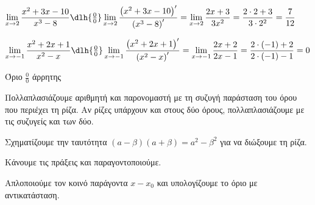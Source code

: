 \lysh\vspace{-5mm}
\begin{alist}
\item $\lim\limits_{x\to 2}{\dfrac{x^2+3x-10}{x^3-8}}\dlh{\frac{0}{0}}\lim\limits_{x\to 2}{\dfrac{\left(x^2+3x-10\right)'}{\left(x^3-8\right)'}}=\lim\limits_{x\to 2}{\dfrac{2x+3}{3x^2}}=\dfrac{2\cdot 2+3}{3\cdot 2^2}=\dfrac{7}{12}$
\item $\lim\limits_{x\to-1}{\dfrac{x^2+2x+1}{x^2-x}}\dlh{\frac{0}{0}}\lim\limits_{x\to-1}{\dfrac{\left(x^2+2x+1\right)'}{\left(x^2-x\right)'}}=\lim\limits_{x\to-1}{\dfrac{2x+2}{2x-1}}=\dfrac{2\cdot\left(-1\right)+2}{2\cdot(-1)-1}=0$
\end{alist}
\begin{askhsh}{Όριο $ \frac{0}{0} $ άρρητης}
\bhmata\begin{bhma}
\item Πολλαπλασιάζουμε αριθμητή και παρονομαστή με τη συζυγή παράσταση του όρου που περιέχει τη ρίζα. Αν ρίζες υπάρχουν και στους δύο όρους, πολλαπλασιάζουμε με τις συζυγείς και των δύο.
\item Σχηματίζουμε την ταυτότητα $(a-\beta)(a+\beta)=a^2-\beta^2$ για να διώξουμε τη ρίζα.
\item Κάνουμε τις πράξεις και παραγοντοποιούμε.
\item Απλοποιούμε τον κοινό παράγοντα $x-x_0$ και υπολογίζουμε το όριο με αντικατάσταση.
\end{bhma}
\end{askhsh}
\lysh\vspace{-5mm}
